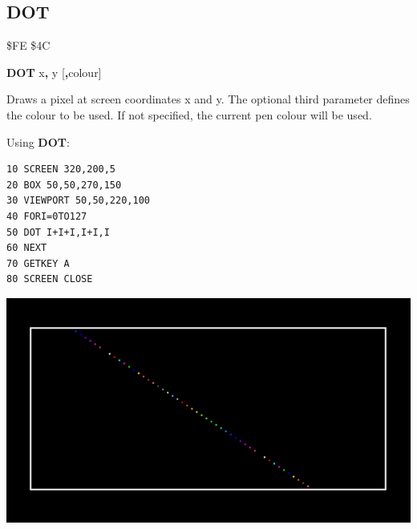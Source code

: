 
\newpage
\subsection{DOT}
\begin{description}[leftmargin=2cm,style=nextline]
\item [Token:] \$FE \$4C
\item [Format:] {\bf DOT} x{\bf,} y [{\bf,}colour]
\item [Usage:] Draws a pixel at screen coordinates x and y.
               The optional third parameter defines the colour
               to be used. If not specified, the current
               pen colour will be used.

\item [Example:] Using {\bf DOT}:
\begin{tcolorbox}[colback=black,coltext=white]
\verbatimfont{\codefont}
\begin{verbatim}
10 SCREEN 320,200,5
20 BOX 50,50,270,150
30 VIEWPORT 50,50,220,100
40 FORI=0TO127
50 DOT I+I+I,I+I,I
60 NEXT
70 GETKEY A
80 SCREEN CLOSE
\end{verbatim}
\end{tcolorbox}
\item \begin{center}\includegraphics[width=0.7\linewidth]{images/dot.png}\end{center}
\end{description}


\newpage
